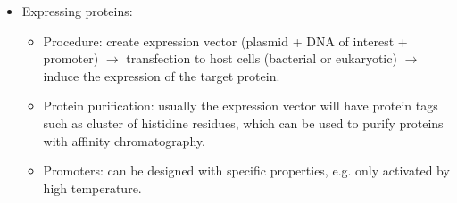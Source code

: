 \documentclass{report}
\begin{document}
\begin{itemize}
\item Expressing proteins: 
\begin{itemize}
\item Procedure: create expression vector (plasmid + DNA of interest + promoter) $\rightarrow$ transfection to host cells (bacterial or eukaryotic) $\rightarrow$ induce the expression of the target protein. 
\item Protein purification: usually the expression vector will have protein tags such as cluster of histidine residues, which can be used to purify proteins with affinity chromatography. 
\item Promoters: can be designed with specific properties, e.g. only activated by high temperature. 
\end{itemize} 
\end{itemize}
\end{document}
